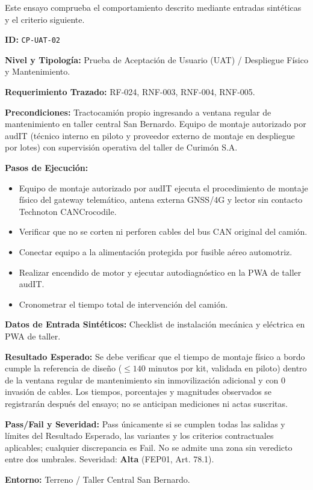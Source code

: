 Este ensayo comprueba el comportamiento descrito mediante entradas sintéticas y el criterio siguiente.

\par\noindent\textbf{ID:} \texttt{CP-\allowbreak{}UAT-\allowbreak{}02}\par
\par\noindent\textbf{Nivel y Tipología:} Prueba de Aceptación de Usuario (UAT) / Despliegue Físico y Mantenimiento.\par
\par\noindent\textbf{Requerimiento Trazado:} RF-024, RNF-003, RNF-004, RNF-005.\par
\par\noindent\textbf{Precondiciones:} Tractocamión propio ingresando a ventana regular de mantenimiento en taller central San Bernardo. Equipo de montaje autorizado por audIT (técnico interno en piloto y proveedor externo de montaje en despliegue por lotes) con supervisión operativa del taller de Curimón S.A.\par
\par\noindent\textbf{Pasos de Ejecución:}\par
\begin{itemize}
\item Equipo de montaje autorizado por audIT ejecuta el procedimiento de montaje físico del gateway telemático, antena externa GNSS/4G y lector sin contacto Technoton CANCrocodile.
\item Verificar que no se corten ni perforen cables del bus CAN original del camión.
\item Conectar equipo a la alimentación protegida por fusible aéreo automotriz.
\item Realizar encendido de motor y ejecutar autodiagnóstico en la PWA de taller audIT.
\item Cronometrar el tiempo total de intervención del camión.
\end{itemize}

\par\noindent\textbf{Datos de Entrada Sintéticos:} Checklist de instalación mecánica y eléctrica en PWA de taller.\par
\par\noindent\textbf{Resultado Esperado:} Se debe verificar que el tiempo de montaje físico a bordo cumple la referencia de diseño (\(\le 140\text{ minutos}\) por kit, validada en piloto) dentro de la ventana regular de mantenimiento sin inmovilización adicional y con 0 invasión de cables. Los tiempos, porcentajes y magnitudes observados se registrarán después del ensayo; no se anticipan mediciones ni actas suscritas.\par
\par\noindent\textbf{Pass/Fail y Severidad:} Pass únicamente si se cumplen todas las salidas y límites del Resultado Esperado, las variantes y los criterios contractuales aplicables; cualquier discrepancia es Fail. No se admite una zona sin veredicto entre dos umbrales. Severidad: \textbf{Alta} (FEP01, Art. 78.1).\par
\par\noindent\textbf{Entorno:} Terreno / Taller Central San Bernardo.\par

